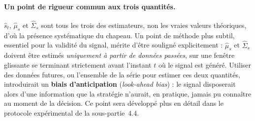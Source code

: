 \documentclass{article}
\begin{document}
\paragraph{Un point de rigueur commun aux trois quantités.} $\hat{s}_t$, $\hat\mu_s$ et $\hat{\Sigma}_s$ sont tous les trois des estimateurs, non les vraies valeurs théoriques, d'où la présence systématique du chapeau. Un point de méthode plus subtil, essentiel pour la validité du signal, mérite d'être souligné explicitement : $\hat\mu_s$ et $\hat{\Sigma}_s$ doivent être estimés \emph{uniquement à partir de données passées}, sur une fenêtre glissante se terminant strictement avant l'instant $t$ où le signal est généré. Utiliser des données futures, ou l'ensemble de la série pour estimer ces deux quantités, introduirait un \textbf{biais d'anticipation} (\emph{look-ahead bias}) : le signal disposerait alors d'une information que la stratégie n'aurait, en pratique, jamais pu connaître au moment de la décision. Ce point sera développé plus en détail dans le protocole expérimental de la sous-partie~4.4.
\end{document}
